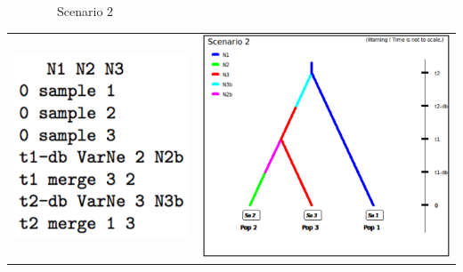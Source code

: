 \ \ \ \ \ \ \ \ Scenario 2

\begin{center}
\begin{tabular}{cc}
\includegraphics[scale=0.5]{code_scenario_05-2}  & \includegraphics[scale=0.4]{test3pop_scenario_2} \tabularnewline
\end{tabular}
\par\end{center}

